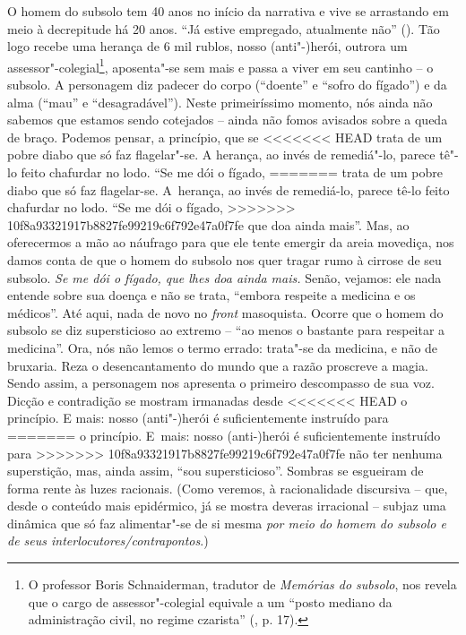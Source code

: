 {{O homem do subsolo tem 40 anos no início da narrativa e vive se
arrastando em meio à decrepitude há 20 anos. ``Já estive empregado,
atualmente não'' (). Tão logo recebe uma herança de 6 mil rublos,
nosso (anti"-)herói, outrora um assessor"-colegial\footnote{O professor
  Boris Schnaiderman, tradutor de \emph{Memórias do subsolo}, nos revela
  que o cargo de assessor"-colegial equivale a um ``posto mediano da
  administração civil, no regime czarista'' (, p. 17).},
aposenta"-se sem mais e passa a viver em seu cantinho -- o subsolo. A
personagem diz padecer do corpo (``doente'' e ``sofro do fígado'') e da
alma (``mau'' e ``desagradável''). Neste primeiríssimo momento, nós
ainda não sabemos que estamos sendo cotejados -- ainda não fomos
avisados sobre a queda de braço. Podemos pensar, a princípio, que se
<<<<<<< HEAD
trata de um pobre diabo que só faz flagelar"-se. A herança, ao invés de
remediá"-lo, parece tê"-lo feito chafurdar no lodo. ``Se me dói o fígado,
=======
trata de um pobre diabo que só faz flagelar-se. A~herança, ao invés de
remediá-lo, parece tê-lo feito chafurdar no lodo. ``Se me dói o fígado,
>>>>>>> 10f8a93321917b8827fe99219c6f792e47a0f7fe
que doa ainda mais''. Mas, ao oferecermos a mão ao náufrago para que ele
tente emergir da areia movediça, nos damos conta de que o homem do
subsolo nos quer tragar rumo à cirrose de seu subsolo. \emph{Se me dói o
fígado, que lhes doa ainda mais.} Senão, vejamos: ele nada entende sobre
sua doença e não se trata, ``embora respeite a medicina e os médicos''.
Até aqui, nada de novo no \emph{front} masoquista. Ocorre que o homem do
subsolo se diz supersticioso ao extremo -- ``ao menos o bastante para
respeitar a medicina''. Ora, nós não lemos o termo errado: trata"-se da
medicina, e não de bruxaria. Reza o desencantamento do mundo que a razão
proscreve a magia. Sendo assim, a personagem nos apresenta o primeiro
descompasso de sua voz. Dicção e contradição se mostram irmanadas desde
<<<<<<< HEAD
o princípio. E mais: nosso (anti"-)herói é suficientemente instruído para
=======
o princípio. E~mais: nosso (anti-)herói é suficientemente instruído para
>>>>>>> 10f8a93321917b8827fe99219c6f792e47a0f7fe
não ter nenhuma superstição, mas, ainda assim, ``sou supersticioso''.
Sombras se esgueiram de forma rente às luzes racionais. (Como veremos, à
racionalidade discursiva -- que, desde o conteúdo mais epidérmico, já se
mostra deveras irracional -- subjaz uma dinâmica que só faz alimentar"-se
de si mesma \emph{por meio do homem do subsolo e de seus
interlocutores/contrapontos}.)

}}

